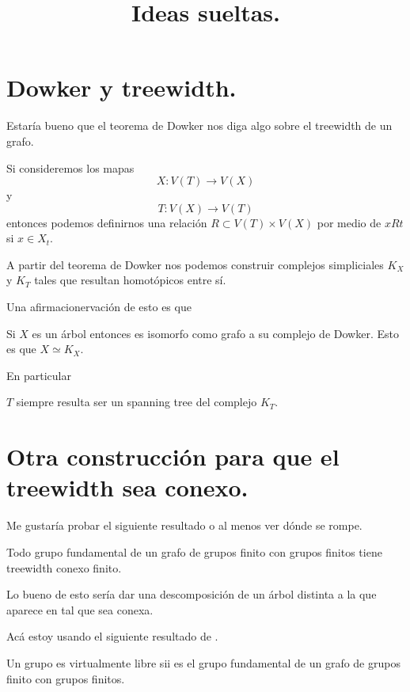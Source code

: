\documentclass[12pt]{article}
\title{Ideas sueltas.}
\date{}
\begin{document}
	
	
\maketitle
	
\section{Dowker y treewidth.}	

Estaría bueno que el teorema de Dowker nos diga algo sobre el treewidth de un grafo.

Si consideremos los mapas
\[
X: V(T) \to V(X)
\]
y 
\[
T: V(X) \to V(T)
\]
entonces podemos definirnos una relación $R \subset V(T) \times V(X)$ por medio de $xRt$ si $x \in X_t$.

A partir del teorema de Dowker nos podemos construir complejos simpliciales $K_X$ y $K_T$ tales que resultan homotópicos entre sí.


Una afirmacionervación de esto es que 
\begin{afirmacion}
	Si $X$ es un árbol entonces es isomorfo como grafo a su complejo de Dowker. 
	Esto es que $X \simeq K_X$.
\end{afirmacion}

En particular 

\begin{afirmacion}
	$T$ siempre resulta ser un spanning tree del complejo $K_T$.
\end{afirmacion}
	
\section{Otra construcción para que el treewidth sea conexo.}

	

Me gustaría probar el siguiente resultado o al menos ver dónde se rompe.

\begin{afirmacion}
	Todo grupo fundamental de un grafo de grupos finito con grupos finitos tiene treewidth conexo finito.
\end{afirmacion}

Lo bueno de esto sería dar una descomposición de un árbol distinta a la que aparece en \cite{diekert_contextfree_2017} tal que sea conexa.

Acá estoy usando el siguiente resultado de \cite{karrass1973finite}.
\begin{teo}
	Un grupo es virtualmente libre sii es el grupo fundamental de un grafo de grupos finito con grupos finitos.
\end{teo}
\end{document}
